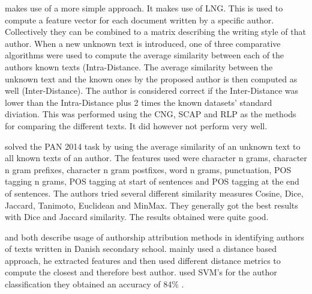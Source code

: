 \cite{layton:2014} makes use of a more simple approach. It makes use of \gls{LNG}. This is used to compute a feature vector for each document
written by a specific author. Collectively they can be combined to a matrix
describing the writing style of that author. When a new unknown text is
introduced, one of three comparative algorithms were used to compute the average
similarity between each of the authors known texts (Intra-Distance. The average
similarity between the unknown text and the known ones by the proposed author is
then computed as well (Inter-Distance). The author is considered correct if
the Inter-Distance was lower than the Intra-Distance plus 2 times the known
datasets' standard diviation. This was performed using the \gls{CNG}, \gls{SCAP} and \gls{RLP} as
the methods for comparing the different texts. It did however not perform very
well.

\cite{castro2015} solved the PAN 2014 task by using the average similarity of an
unknown text to all known texts of an author. The features used were character n
grams, character n gram prefixes, character n gram postfixes, word n grams,
punctuation, \gls{POS} tagging n grams, \gls{POS} tagging at start of sentences
and \gls{POS} tagging at the end of sentences. The authors tried several
different similarity measures Cosine, Dice, Jaccard, Tanimoto, Euclidean and
MinMax. They generally got the best results with Dice and Jaccard similarity.
The results obtained were quite good.

\cite{hansen2014} and \cite{aalykke2016} both describe usage of authorship
attribution methods in identifying authors of texts written in Danish secondary
school. \cite{aalykke2016} mainly used a distance based approach, he extracted
features and then used different distance metrics to compute the closest and
therefore best author. \cite{hansen2014} used SVM's for the author
classification they obtained an accuracy of 84\% .
